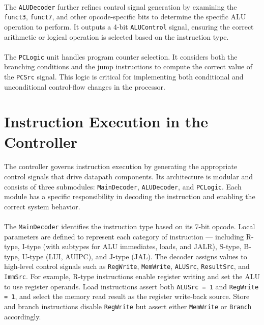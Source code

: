 \documentclass[12pt]{report}
\begin{document}
\paragraph{}
The \texttt{ALUDecoder} further refines control signal generation by examining the \texttt{funct3}, \texttt{funct7}, and other opcode-specific bits to determine the specific ALU operation to perform. It outputs a 4-bit \texttt{ALUControl} signal, ensuring the correct arithmetic or logical operation is selected based on the instruction type.

\paragraph{}
The \texttt{PCLogic} unit handles program counter selection. It considers both the branching conditions and the jump instructions to compute the correct value of the \texttt{PCSrc} signal. This logic is critical for implementing both conditional and unconditional control-flow changes in the processor.

\section{Instruction Execution in the Controller}

\paragraph{}
The controller governs instruction execution by generating the appropriate control signals that drive datapath components. Its architecture is modular and consists of three submodules: \texttt{MainDecoder}, \texttt{ALUDecoder}, and \texttt{PCLogic}. Each module has a specific responsibility in decoding the instruction and enabling the correct system behavior.

\paragraph{}
The \texttt{MainDecoder} identifies the instruction type based on its 7-bit opcode. Local parameters are defined to represent each category of instruction — including R-type, I-type (with subtypes for ALU immediates, loads, and JALR), S-type, B-type, U-type (LUI, AUIPC), and J-type (JAL). The decoder assigns values to high-level control signals such as \texttt{RegWrite}, \texttt{MemWrite}, \texttt{ALUSrc}, \texttt{ResultSrc}, and \texttt{ImmSrc}. For example, R-type instructions enable register writing and set the ALU to use register operands. Load instructions assert both \texttt{ALUSrc = 1} and \texttt{RegWrite = 1}, and select the memory read result as the register write-back source. Store and branch instructions disable \texttt{RegWrite} but assert either \texttt{MemWrite} or \texttt{Branch} accordingly.
\end{document}
